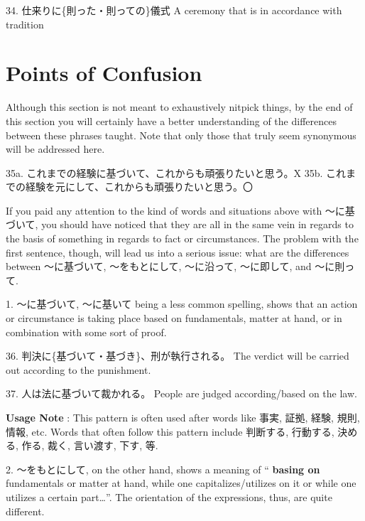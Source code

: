 \par{34. 仕来りに\{則った・則っての\}儀式 \hfill\break
A ceremony that is in accordance with tradition }
      
\section{Points of Confusion}
 
\par{ Although this section is not meant to exhaustively nitpick things, by the end of this section you will certainly have a better understanding of the differences between these phrases taught. Note that only those that truly seem synonymous will be addressed here. }

\par{35a. これまでの経験に基づいて、これからも頑張りたいと思う。X \hfill\break
35b. これまでの経験を元にして、これからも頑張りたいと思う。〇 }

\par{ If you paid any attention to the kind of words and situations above with ～に基づいて, you should have noticed that they are all in the same vein in regards to the basis of something in regards to fact or circumstances. The problem with the first sentence, though, will lead us into a serious issue: what are the differences between ～に基づいて, ～をもとにして, ～に沿って, ～に即して, and ～に則って. }
 
\par{1. ～に基づいて, ～に基いて being a less common spelling, shows that an action or circumstance is taking place based on fundamentals, matter at hand, or in combination with some sort of proof. }

\par{36. 判決に\{基づいて・基づき\}、刑が執行される。 \hfill\break
The verdict will be carried out according to the punishment. }
 
\par{37. 人は法に基づいて裁かれる。 \hfill\break
People are judged according\slash based on the law. }
 
\par{\textbf{Usage Note }: This pattern is often used after words like 事実, 証拠, 経験, 規則, 情報, etc. Words that often follow this pattern include 判断する, 行動する, 決める, 作る, 裁く, 言い渡す, 下す, 等. }
 
\par{2. ～をもとにして, on the other hand, shows a meaning of “ \textbf{basing on }fundamentals or matter at hand, while one capitalizes\slash utilizes on it or while one utilizes a certain part…”. The orientation of the expressions, thus, are quite different. }
 
